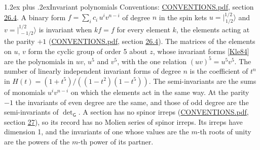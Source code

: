 \documentclass[10pt,a4paper]{article}
\makeatletter
\renewcommand\section{\@startsection{section}{1}{\z@}{-3ex plus -1ex minus -.2ex}%
  {1.2ex plus .2ex}{\normalfont\large\sffamily\bfseries\color{parttitle}}}
\numberwithin{equation}{section}
\newcommand{\grp}[1]{\mathsf{#1}}
\newcommand{\jm}[2]{\bigl\lvert{}^{#1}_{\,#2}\bigr\rangle}
\makeatother
\begin{document}
\section{Invariant polynomials}\label{s:invariants}
Conventions: \href{../../CONVENTIONS.pdf}{CONVENTIONS.pdf}, section \href{../../CONVENTIONS.pdf\#conv.26.4}{26.4}.
\leavevmode\label{n:local.spinor.uv}\label{n:local.binary.form}A binary form $f = \sum_i c_i\, u^i v^{n-i}$ of degree $n$ in the spin kets $u = \jm{1/2}{1/2}$ and $v = \jm{1/2}{-1/2}$ is invariant when $k f = f$ for every element $k$, the elements acting at the parity $+1$ (\href{../../CONVENTIONS.pdf}{CONVENTIONS.pdf}, section \href{../../CONVENTIONS.pdf\#conv.26.4}{26.4}).
The matrices of the elements on $u$, $v$ form the cyclic group of order 5 about $z$, whose invariant forms [\href{../../../REFERENCES.pdf\#ref.Kle84}{Kle84}] are the polynomials in $uv$, $u^{5}$ and $v^{5}$, with the one relation $(uv)^{5} = u^{5}v^{5}$. \label{n:function.hilbert}The number of linearly independent invariant forms of degree $n$ is the coefficient of $t^n$ in $H(t) = (1 + t^{5})/((1-t^{2})(1-t^{5}))$. The semi-invariants are the sums of monomials $u^i v^{n-i}$ on which the elements act in the same way. At the parity $-1$ the invariants of even degree are the same, and those of odd degree are the semi-invariants of $\det_{\grp{G}}$. A section has no spinor irreps (\href{../../CONVENTIONS.pdf}{CONVENTIONS.pdf}, section \href{../../CONVENTIONS.pdf\#conv.27}{27}), so its record has no Molien series of spinor irreps. Its irreps have dimension 1, and the invariants of one whose values are the $m$-th roots of unity are the powers of the $m$-th power of its partner.
\end{document}
